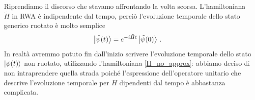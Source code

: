 \vspace{1cm}

\noindent{}

\vspace{0.5cm}

\noindent Riprendiamo il discorso che stavamo affrontando la volta scorsa. L'hamiltoniana $\tilde{H}$ in RWA è indipendente dal tempo, perciò l'evoluzione temporale dello stato generico ruotato è molto semplice
\begin{equation}\label{to_exp_H_tilde}
    \ket{\tilde{\psi}(t)} = e^{-i \tilde{H} t} \ket{\tilde{\psi}(0)} \, .
\end{equation}
In realtà avremmo potuto fin dall'inizio scrivere l'evoluzione temporale dello stato $\ket{\psi (t)}$ non ruotato, utilizzando l'hamiltoniana \eqref{H_no_approx}: abbiamo deciso di non intraprendere quella strada poiché l'espressione dell'operatore unitario che descrive l'evoluzione temporale per $H$ dipendenti dal tempo è abbastanza complicata. 

